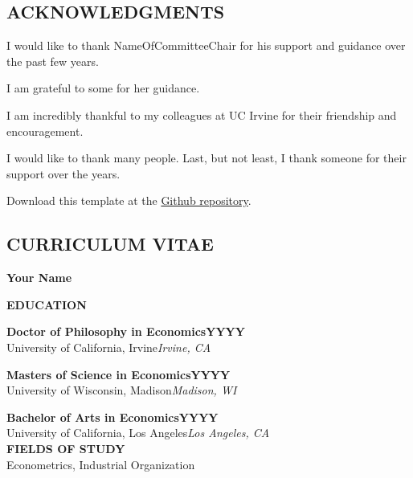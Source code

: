 \documentclass[letterpaper]{report}
\begin{document}
\doublespacing
\newpage
\begin{center}
  \section*{ACKNOWLEDGMENTS}
\end{center}

I would like to thank NameOfCommitteeChair for his support and guidance over the past few years.

I am grateful to some for her guidance.

I am incredibly thankful to my colleagues at UC Irvine for their friendship and encouragement.

I would like to thank many people. Last, but not least, I thank someone for their support over the years.

Download this template at the \href{https://github.com/howardhsumail/Dissertation-LaTeX-Template.git}{Github repository}.

\newpage
\begin{center}
  \section*{CURRICULUM VITAE}
  
  {\fontsize{12}{12}\selectfont
  \textbf{Your Name}
  }
\end{center}

\textbf{EDUCATION}

\textbf{Doctor of Philosophy in Economics\hfill YYYY}\\[-0.2cm]
University of California, Irvine\hfill \textit{Irvine, CA}

\textbf{Masters of Science in Economics\hfill YYYY}\\[-0.2cm]
University of Wisconsin, Madison\hfill \textit{Madison, WI}

\textbf{Bachelor of Arts in Economics\hfill YYYY}\\[-0.2cm]
University of California, Los Angeles\hfill \textit{Los Angeles, CA}\\

\textbf{FIELDS OF STUDY}\\
Econometrics, Industrial Organization
\end{document}
